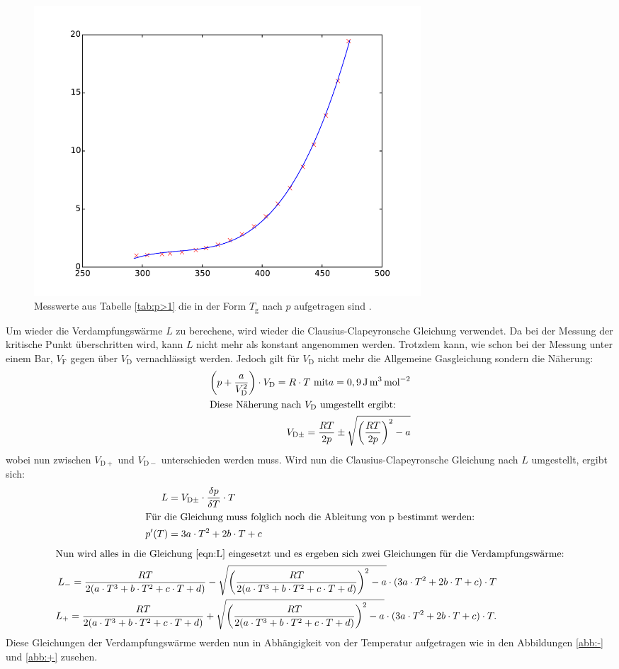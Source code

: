 \begin{figure}
  \centering
  \includegraphics[width=0.7\textwidth]{plot2.pdf}
  \caption{Messwerte aus Tabelle \ref{tab:p>1} die in der Form $T_\mathrm{g}$ nach $p$ aufgetragen sind .}
  \label{abb:plot2}
\end{figure}
\FloatBarrier
Um wieder die Verdampfungswärme $L$ zu berechene,
wird wieder die Clausius-Clapeyronsche Gleichung
verwendet. Da bei der Messung der kritische Punkt überschritten
wird, kann $L$ nicht mehr als konstant angenommen werden.
Trotzdem kann, wie schon bei der Messung unter einem Bar,
$V_\mathrm{F}$ gegen über $V_\mathrm{D}$ vernachlässigt werden.
Jedoch gilt für $V_\mathrm{D}$ nicht mehr die Allgemeine
Gasgleichung sondern die Näherung:
\begin{align}
\left(p+\frac{a}{V_\mathrm{D}^2}\right)\cdot V_\mathrm{D}=R\cdot T \, \, \text{mit}  a=0,9\,\si{\joule\cubic\meter\per\mol\tothe{2}}\\
\intertext{Diese Näherung nach $V_\mathrm{D}$ umgestellt ergibt:}
V_{\mathrm{D\pm}}=\frac{RT}{2p}\pm\sqrt{\left(\frac{RT}{2p}\right)^2-a}
\end{align}
wobei nun zwischen $V_\mathrm{D+}$ und  $V_\mathrm{D-}$ unterschieden werden muss.
Wird nun die Clausius-Clapeyronsche Gleichung nach $L$ umgestellt, ergibt sich:
\begin{align}
L&=V_\mathrm{D\pm}\cdot \frac{\delta p}{\delta T} \cdot T\label{eqn:L}\\
\intertext{Für die Gleichung muss folglich noch die Ableitung von p bestimmt werden:}
p'(T)&=3a\cdot T^2+ 2b\cdot T + c
\end{align}
\begin{align}
\intertext{Nun wird alles in die Gleichung \eqref{eqn:L} eingesetzt und es ergeben sich zwei Gleichungen für die Verdampfungswärme:}
L_-=\frac{RT}{2(a\cdot T^3+b\cdot T^2 + c\cdot T + d)}-\sqrt{\left(\frac{RT}{2(a\cdot T^3+b\cdot T^2 + c\cdot T + d)}\right)^2-a} \cdot (3a\cdot T^2+ 2b\cdot T + c )\cdot T\label{eqn:L-}\\
L_+=\frac{RT}{2(a\cdot T^3+b\cdot T^2 + c\cdot T + d)}+\sqrt{\left(\frac{RT}{2(a\cdot T^3+b\cdot T^2 + c\cdot T + d)}\right)^2-a} \cdot (3a\cdot T^2+ 2b\cdot T + c)\cdot T.\label{eqn:L+}
\end{align}
Diese Gleichungen der Verdampfungswärme werden nun in Abhängigkeit
von der Temperatur aufgetragen wie in den Abbildungen \ref{abb:-} und \ref{abb:+}
zusehen.


